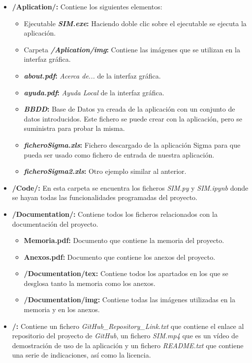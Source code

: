 \begin{itemize}
	\item 
	\textbf{/Aplication/:} Contiene los siguientes elementos:   
		\begin{itemize}
		\item Ejecutable \textbf{\emph{SIM.exe}:} Haciendo doble clic sobre el ejecutable se ejecuta la aplicación.
		\item Carpeta \textbf{\emph{/Aplication/img}:} Contiene las imágenes que se utilizan en la interfaz gráfica.
		\item \textbf{\emph{about.pdf}:} \emph{Acerca de...} de la interfaz gráfica.
		\item  \textbf{\emph{ayuda.pdf}:} \emph{Ayuda Local} de la interfaz gráfica.
		\item  \textbf{\emph{BBDD}:} Base de Datos ya creada de la aplicación con un conjunto de datos introducidos. Este fichero se puede crear con la aplicación, pero se suministra para probar la misma.
		\item  \textbf{\emph{ficheroSigma.xls}:} Fichero descargado de la aplicación {Sigma} para que pueda ser usado como fichero de entrada de nuestra aplicación.
		\item  \textbf{\emph{ficheroSigma2.xls}:} Otro ejemplo similar al anterior.
		
		\end{itemize}
	\item 
	\textbf{/Code/:} En esta carpeta se encuentra los ficheros \emph{SIM.py} y \emph{SIM.ipynb} donde se hayan todas las funcionalidades programadas del proyecto.
	
	\item 
	\textbf{/Documentation/:} Contiene todos los ficheros relacionados con la documentación del proyecto.
			
			\begin{itemize}
			\item \textbf{Memoria.pdf:} Documento que contiene la memoria del proyecto. 			
	
			\item \textbf{Anexos.pdf:} Documento que contiene los anexos del proyecto.
			
			\item \textbf{/Documentation/tex:} Contiene todos los apartados en los que se desglosa tanto la memoria como los anexos.
			\item \textbf{/Documentation/img:} Contiene todas las imágenes utilizadas en la memoria y en los anexos.
			\end{itemize}
	
	\item 
	\textbf{/:} Contiene un fichero \emph{GitHub\_Repository\_Link.txt} que contiene el enlace al repositorio del proyecto de \emph{GitHub}, un fichero \emph{SIM.mp4} que es un vídeo de demostración de uso de la aplicación y un fichero \emph{README.txt} que contiene una serie de indicaciones, así como la licencia.
	
\end{itemize}

